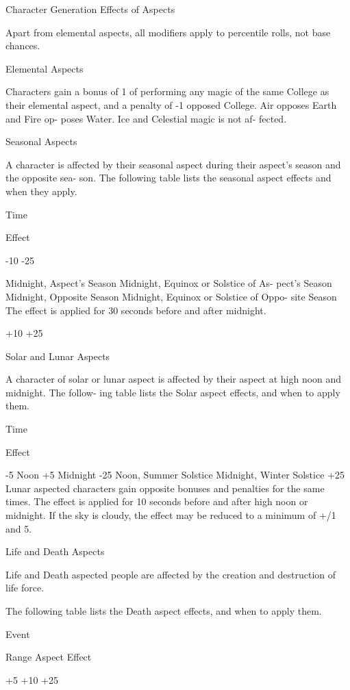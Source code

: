 \begin{Chapter}{Character Generation}
Effects of Aspects 

Apart  from  elemental  aspects,  all  modifiers  apply 
to percentile rolls, not base chances. 

Elemental Aspects 

Characters gain a bonus of 1%
of  performing  any  magic  of  the  same  College  as 
their elemental aspect, and a penalty of -1%
opposed  College.  Air  opposes  Earth  and  Fire  op-
poses  Water.  Ice  and  Celestial  magic  is  not  af-
fected. 

Seasonal Aspects 

A  character  is  affected  by  their  seasonal  aspect 
during  their  aspect’s  season  and  the  opposite  sea-
son.  The  following  table  lists  the  seasonal  aspect 
effects and when they apply. 

Time  

Effect 

-10 
-25 

Midnight, Aspect’s Season  
Midnight, Equinox or Solstice of As-
pect’s Season  
Midnight, Opposite Season  
Midnight, Equinox or Solstice of Oppo-
site Season  
The  effect  is  applied  for  30  seconds  before  and 
after midnight. 

+10 
+25 

Solar and Lunar Aspects 

A  character  of  solar  or  lunar  aspect  is  affected  by 
their aspect at high noon and midnight. The follow-
ing table lists the Solar aspect effects, and when to 
apply them. 

Time  

Effect 

-5 
Noon  
+5 
Midnight  
-25 
Noon, Summer Solstice  
Midnight, Winter Solstice   +25 
Lunar  aspected  characters  gain  opposite  bonuses 
and  penalties  for  the  same  times.  The  effect  is 
applied  for  10  seconds  before  and  after  high  noon 
or midnight. If the sky is cloudy, the effect may be 
reduced to a minimum of +/1 and 5. 

Life and Death Aspects 

Life and Death aspected people are affected by the 
creation and destruction of life force. 

The  following  table  lists  the  Death  aspect  effects, 
and when to apply them. 

Event  

Range  Aspect  Effect 

+5 
+10 
+25 


\end{Chapter}
